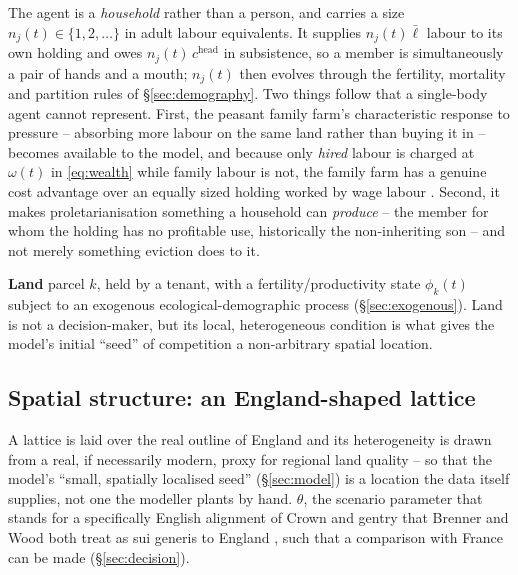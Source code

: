\documentclass[11pt,english]{article}
\begin{document}
The agent is a \emph{household} rather than a person, and carries a size $n_j(t)\in\{1,2,\dots\}$ in adult labour equivalents. It supplies $n_j(t)\bar\ell$ labour to its own holding and owes $n_j(t)\,c^{\text{head}}$ in subsistence, so a member is simultaneously a pair of hands and a mouth; $n_j(t)$ then evolves through the fertility, mortality and partition rules of \S\ref{sec:demography}. Two things follow that a single-body agent cannot represent. First, the peasant family farm's characteristic response to pressure -- absorbing more labour on the same land rather than buying it in -- becomes available to the model, and because only \emph{hired} labour is charged at $\omega(t)$ in \eqref{eq:wealth} while family labour is not, the family farm has a genuine cost advantage over an equally sized holding worked by wage labour \cite{chayanov1966theory}. Second, it makes proletarianisation something a household can \emph{produce} -- the member for whom the holding has no profitable use, historically the non-inheriting son -- and not merely something eviction does to it.

\textbf{Land} parcel $k$, held by a tenant, with a fertility/productivity state $\phi_k(t)$ subject to an exogenous ecological-demographic process (\S\ref{sec:exogenous}). Land is not a decision-maker, but its local, heterogeneous condition is what gives the model's initial ``seed'' of competition a non-arbitrary spatial location.

\subsection{Spatial structure: an England-shaped lattice}
\label{sec:space}

A lattice is laid over the real outline of England and its heterogeneity is drawn from a real, if necessarily modern, proxy for regional land quality -- so that the model's ``small, spatially localised seed'' (\S\ref{sec:model}) is a location the data itself supplies, not one the modeller plants by hand. $\theta$, the scenario parameter that stands for a specifically English alignment of Crown and gentry that Brenner and Wood both treat as sui generis to England \cite[p.68-75]{brenner1976agrarian,wood2002origin}, such that a comparison with France can be made (\S\ref{sec:decision}).
\end{document}
